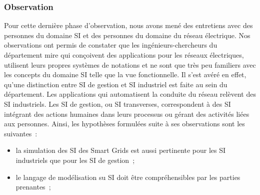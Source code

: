 			\subsubsection{Observation}
		Pour cette dernière phase d'observation, nous avons mené des entretiens avec des personnes du domaine SI et des personnes du domaine du réseau électrique. Nos observations ont permis de constater que les ingénieurs-chercheurs du département \gls{mire} qui conçoivent des applications pour les réseaux électriques, utilisent leurs propres systèmes de notations et ne sont que très peu familiers avec les concepts du domaine SI telle que la vue fonctionnelle. Il s'est avéré en effet, qu'une distinction entre SI de gestion et SI industriel est faite au sein du département. Les applications qui automatisent la conduite du réseau relèvent des SI industriels. Les SI de gestion, ou SI transverses, correspondent à des SI intégrant des actions humaines dans leurs processus ou gérant des activités liées aux personnes.
		Ainsi, les hypothèses formulées suite à ses observations sont les suivantes~:
		\begin{itemize}
			\item la simulation des SI des Smart Grids est aussi pertinente pour les SI industriels que pour les SI de gestion~;
			\item le langage de modélisation su SI doit être compréhensibles par les parties prenantes~;
		\end{itemize}	 
